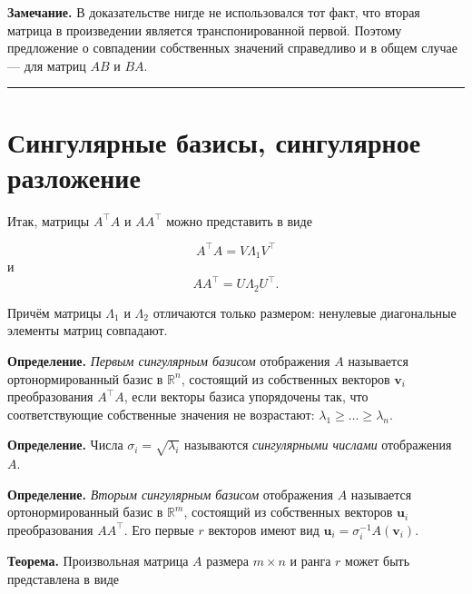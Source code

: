 \documentclass[11pt,a4paper]{article}
\renewcommand{\linethickness}{0.1ex}
\begin{document}
\textbf{Замечание.} В доказательстве нигде не использовался тот факт,
что вторая матрица в произведении является транспонированной первой.
Поэтому предложение о совпадении собственных значений справедливо и в
общем случае --- для матриц \(AB\) и \(BA\).

    \begin{center}\rule{0.5\linewidth}{\linethickness}\end{center}

    \hypertarget{ux441ux438ux43dux433ux443ux43bux44fux440ux43dux44bux435-ux431ux430ux437ux438ux441ux44b-ux441ux438ux43dux433ux443ux43bux44fux440ux43dux43eux435-ux440ux430ux437ux43bux43eux436ux435ux43dux438ux435}{%
\section{Сингулярные базисы, сингулярное
разложение}\label{ux441ux438ux43dux433ux443ux43bux44fux440ux43dux44bux435-ux431ux430ux437ux438ux441ux44b-ux441ux438ux43dux433ux443ux43bux44fux440ux43dux43eux435-ux440ux430ux437ux43bux43eux436ux435ux43dux438ux435}}

Итак, матрицы \(A^\top A\) и \(A A^\top\) можно представить в виде

\[ A^\top A = V \Lambda_1 V^\top  \tag{1}\label{AtA_decomp} \] и
\[ A A^\top = U \Lambda_2 U^\top. \tag{2}\label{AAt_decomp} \]

Причём матрицы \(\Lambda_1\) и \(\Lambda_2\) отличаются только размером:
ненулевые диагональные элементы матриц совпадают.

\textbf{Определение.} \emph{Первым сингулярным базисом} отображения
\(A\) называется ортонормированный базис в \(\mathbb{R}^n\), состоящий
из собственных векторов \(\mathbf{v}_i\) преобразования \(A^\top A\),
если векторы базиса упорядочены так, что соответствующие собственные
значения не возрастают: \(\lambda_1 \ge \ldots \ge \lambda_n\).

\textbf{Определение.} Числа \(\sigma_i = \sqrt{\lambda_i}\) называются
\emph{сингулярными числами} отображения \(A\).

\textbf{Определение.} \emph{Вторым сингулярным базисом} отображения
\(A\) называется ортонормированный базис в \(\mathbb{R}^m\), состоящий
из собственных векторов \(\mathbf{u}_i\) преобразования \(A A^\top\).
Его первые \(r\) векторов имеют вид
\(\mathbf{u}_i = \sigma_i^{-1} A(\mathbf{v}_i)\).

\textbf{Теорема.} Произвольная матрица \(A\) размера \(m \times n\) и
ранга \(r\) может быть представлена в виде
\end{document}

